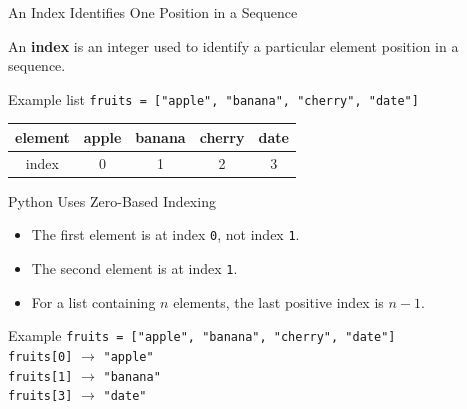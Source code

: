 \documentclass[aspectratio=169,10pt]{beamer}
\begin{document}

\begin{frame}{An Index Identifies One Position in a Sequence}
  \begin{cpdefinition}
    An \textbf{index} is an integer used to identify a particular element position in a sequence.
  \end{cpdefinition}

  \begin{block}{Example list}
    \centering
    \texttt{fruits = ["apple", "banana", "cherry", "date"]}
  \end{block}

  \begin{center}
    \renewcommand{\arraystretch}{1.3}
    \begin{tabular}{c|c|c|c|c}
      element & apple & banana & cherry & date \\\hline
      index & 0 & 1 & 2 & 3
    \end{tabular}
  \end{center}
\end{frame}

\begin{frame}{Python Uses Zero-Based Indexing}
  \begin{itemize}
    \item The first element is at index \texttt{0}, not index \texttt{1}.
    \item The second element is at index \texttt{1}.
    \item For a list containing \(n\) elements, the last positive index is \(n-1\).
  \end{itemize}

  \begin{block}{Example}
    \texttt{fruits = ["apple", "banana", "cherry", "date"]}\\[0.10in]
    \texttt{fruits[0]} $\longrightarrow$ \texttt{"apple"}\\
    \texttt{fruits[1]} $\longrightarrow$ \texttt{"banana"}\\
    \texttt{fruits[3]} $\longrightarrow$ \texttt{"date"}
  \end{block}
\end{frame}
\end{document}
